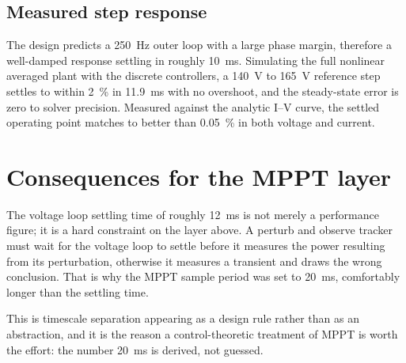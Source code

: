 \subsection{Measured step response}

The design predicts a \SI{250}{\hertz} outer loop with a large phase margin,
therefore a well-damped response settling in roughly \SI{10}{\milli\second}.
Simulating the full nonlinear averaged plant with the discrete controllers, a
\SI{140}{\volt} to \SI{165}{\volt} reference step settles to within
\SI{2}{\percent} in \SI{11.9}{\milli\second} with no overshoot, and the
steady-state error is zero to solver precision. Measured against the analytic
I--V curve, the settled operating point matches to better than
\SI{0.05}{\percent} in both voltage and current.

\section{Consequences for the MPPT layer}

The voltage loop settling time of roughly \SI{12}{\milli\second} is not merely a
performance figure; it is a hard constraint on the layer above. A perturb and
observe tracker must wait for the voltage loop to settle before it measures the
power resulting from its perturbation, otherwise it measures a transient and
draws the wrong conclusion. That is why the MPPT sample period was set to
\SI{20}{\milli\second}, comfortably longer than the settling time.

This is timescale separation appearing as a design rule rather than as an
abstraction, and it is the reason a control-theoretic treatment of MPPT is
worth the effort: the number \SI{20}{\milli\second} is derived, not guessed.
